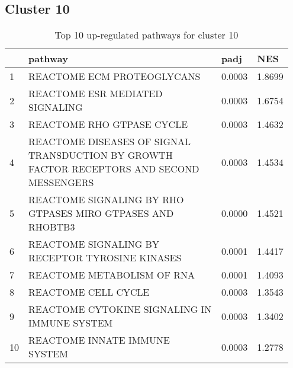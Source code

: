 \documentclass{article}
\begin{document}
\subsection{Cluster 10 }
\begin{table}[H]
\centering
\begin{tabular}{p{0.05\linewidth}p{0.7\linewidth}p{0.1\linewidth}p{0.1\linewidth}}
  \hline
 & pathway & padj & NES \\ 
  \hline
1 & REACTOME ECM PROTEOGLYCANS & 0.0003 & 1.8699 \\ 
  2 & REACTOME ESR MEDIATED SIGNALING & 0.0003 & 1.6754 \\ 
  3 & REACTOME RHO GTPASE CYCLE & 0.0003 & 1.4632 \\ 
  4 & REACTOME DISEASES OF SIGNAL TRANSDUCTION BY GROWTH FACTOR RECEPTORS AND SECOND MESSENGERS & 0.0003 & 1.4534 \\ 
  5 & REACTOME SIGNALING BY RHO GTPASES MIRO GTPASES AND RHOBTB3 & 0.0000 & 1.4521 \\ 
  6 & REACTOME SIGNALING BY RECEPTOR TYROSINE KINASES & 0.0001 & 1.4417 \\ 
  7 & REACTOME METABOLISM OF RNA & 0.0001 & 1.4093 \\ 
  8 & REACTOME CELL CYCLE & 0.0003 & 1.3543 \\ 
  9 & REACTOME CYTOKINE SIGNALING IN IMMUNE SYSTEM & 0.0003 & 1.3402 \\ 
  10 & REACTOME INNATE IMMUNE SYSTEM & 0.0003 & 1.2778 \\ 
   \hline
\end{tabular}
\caption{Top 10 up-regulated pathways for cluster 10} 
\label{tab:q3_2_10}
\end{table}
\end{document}
